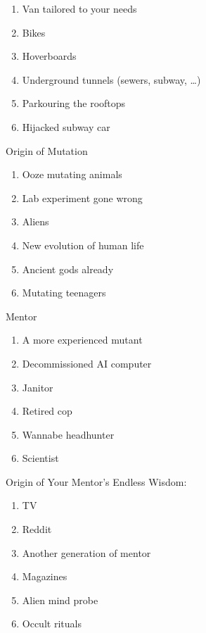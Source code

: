 \begin{enumerate}
    \setlength\itemsep{-0.5em}
    \item Van tailored to your needs
    \item Bikes
    \item Hoverboards
    \item Underground tunnels (sewers, subway, …)
    \item Parkouring the rooftops
    \item Hijacked subway car
\end{enumerate}


\Large{}Origin of Mutation


\normalfont\large 
\begin{enumerate}
    \setlength\itemsep{-0.5em}
    \item Ooze mutating animals
    \item Lab experiment gone wrong
    \item Aliens
    \item New evolution of human life
    \item Ancient gods already
    \item Mutating teenagers
\end{enumerate}


\Large{}Mentor

\medskip

\normalfont\large 
\begin{enumerate}
    \setlength\itemsep{-0.5em}
    \item A more experienced mutant
    \item Decommissioned AI computer
    \item Janitor
    \item Retired cop
    \item Wannabe headhunter
    \item Scientist
\end{enumerate}


\Large{}Origin of Your Mentor's Endless Wisdom:


\normalfont\large
\begin{enumerate}
    \setlength\itemsep{-0.5em}
    \item TV
    \item Reddit
    \item Another generation of mentor
    \item Magazines
    \item Alien mind probe
    \item Occult rituals
\end{enumerate}

